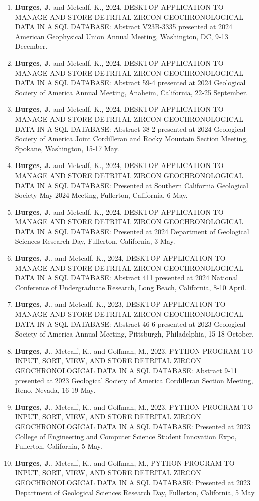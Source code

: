 \documentclass{res} %
\begin{document}
\begin{resume}
\begin{enumerate}
\item \textbf{Burges, J.} and Metcalf, K., 2024, DESKTOP APPLICATION TO MANAGE AND STORE DETRITAL ZIRCON
GEOCHRONOLOGICAL DATA IN A SQL DATABASE: Abstract V23B-3335 presented at 2024 American 
Geophysical Union Annual Meeting, Washington, DC, 9-13 December.
\item \textbf{Burges, J.} and Metcalf, K., 2024, DESKTOP APPLICATION TO MANAGE AND STORE DETRITAL ZIRCON
GEOCHRONOLOGICAL DATA IN A SQL DATABASE: Abstract 59-4 presented at 2024 Geological Society of
America Annual Meeting, Anaheim, California, 22-25 September.
\item \textbf{Burges, J.} and Metcalf, K., 2024, DESKTOP APPLICATION TO MANAGE AND STORE DETRITAL ZIRCON
GEOCHRONOLOGICAL DATA IN A SQL DATABASE: Abstract 38-2 presented at 2024 Geological Society of
America Joint Cordilleran and Rocky Mountain Section Meeting, Spokane, Washington, 15-17 May.
\item \textbf{Burges, J.} and Metcalf, K., 2024, DESKTOP APPLICATION TO MANAGE AND STORE DETRITAL ZIRCON
GEOCHRONOLOGICAL DATA IN A SQL DATABASE: Presented at Southern California Geological Society
May 2024 Meeting, Fullerton, California, 6 May.
\item \textbf{Burges, J.} and Metcalf, K., 2024, DESKTOP APPLICATION TO MANAGE AND STORE DETRITAL ZIRCON
GEOCHRONOLOGICAL DATA IN A SQL DATABASE: Presented at 2024 Department of Geological Sciences
Research Day, Fullerton, California, 3 May.
\item \textbf{Burges, J.}, and Metcalf, K., 2024, DESKTOP APPLICATION TO MANAGE AND STORE
DETRITAL ZIRCON GEOCHRONOLOGICAL DATA IN A SQL DATABASE: Abstract
411 presented at 2024 National Conference of Undergraduate Research, Long Beach, California, 8-10 April.

\item \textbf{Burges, J.}, and Metcalf, K., 2023, DESKTOP APPLICATION TO MANAGE AND STORE
DETRITAL ZIRCON GEOCHRONOLOGICAL DATA IN A SQL DATABASE: Abstract
46-6 presented at 2023 Geological Society of America Annual Meeting, Pittsburgh, Philadelphia, 15-18
October.
\item \textbf{Burges, J.}, Metcalf, K., and Goffman, M., 2023, PYTHON PROGRAM TO INPUT, SORT, VIEW, AND STORE
DETRITAL ZIRCON GEOCHRONOLOGICAL DATA IN A SQL DATABASE: Abstract 9-11 presented at 2023
Geological Society of America Cordilleran Section Meeting, Reno, Nevada, 16-19 May.
\item \textbf{Burges, J.}, Metcalf, K., and Goffman, M., 2023, PYTHON PROGRAM TO INPUT, SORT, VIEW, AND STORE
DETRITAL ZIRCON GEOCHRONOLOGICAL DATA IN A SQL DATABASE: Presented at 2023 College of
Engineering and Computer Science Student Innovation Expo, Fullerton, California, 5 May.
\item \textbf{Burges, J.}, Metcalf, K., and Goffman, M., PYTHON PROGRAM TO INPUT, SORT, VIEW, AND STORE DETRITAL
ZIRCON GEOCHRONOLOGICAL DATA IN A SQL DATABASE: Presented at 2023 Department of Geological
Sciences Research Day, Fullerton, California, 5 May
\end{enumerate}


\end{resume}
\end{document}
